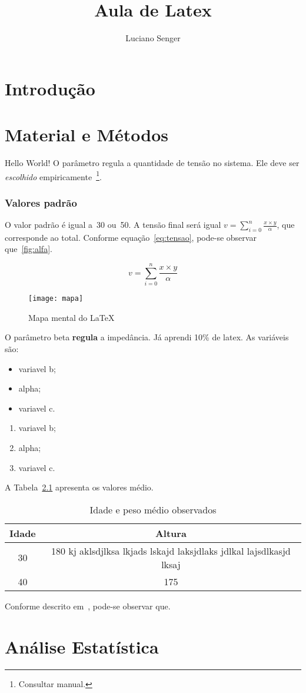 \documentclass[a4paper, brazil, 12pt , onecolumn]{report}
\title{Aula de Latex}
\author{Luciano Senger}
\begin{document}
	\maketitle
	\tableofcontents
	\listoffigures
	\listoftables
\chapter{Introdução}
\lipsum[1-3]
\chapter{Material e Métodos}

Hello    World!
O parâmetro   regula a quantidade de tensão no sistema.
Ele deve ser \textit{escolhido} empiricamente~\footnote{Consultar manual.}.
\subsection{Valores padrão}
O valor padrão é igual a~30 ou~50.
A tensão final será igual $v = \sum_{i=0}^n \frac{x \times y}{\alpha}$, que corresponde ao total.
Conforme equação~\ref{eq:tensao}, pode-se observar que~\ref{fig:alfa}.

\begin{equation}
	v = \sum_{i=0}^n \frac{x \times y}{\alpha}
\end{equation}\label{eq:tensao}

\begin{figure}[htb]
	\centering
	\texttt{[image: mapa]}
	\caption{Mapa mental do \LaTeX}
\end{figure}\label{fig:alfa}

O parâmetro {\Huge beta} \textbf{regula} a impedância.
Já aprendi 10\% de latex.
As variáveis são:
\begin{itemize}
	\item variavel b;
	\item alpha;
	\item variavel c.
\end{itemize}

\begin{enumerate}
	\item variavel b;
	\item alpha;
	\item variavel c.
\end{enumerate}
A Tabela~\ref{tab:idade} apresenta os valores médio.
\begin{table}[htb]
	\caption{Idade e peso médio observados}\label{tab:idade}
	\centering
	
	\begin{tabular}{cc}
		\hline
		\bf Idade & \bf Altura \\ 
		\hline
		30 & 180 kj aklsdjlksa lkjads lskajd laksjdlaks jdlkal lajsdlkasjd lksaj\\
		40 & 175 \\
		\hline
\end{tabular}		
\end{table}
\lstset{language=Python}


Conforme descrito em~\cite{Harris2012,Hennessy2014,Goodfellow2016,Mota2011}, pode-se observar que.
\appendix
\chapter{Análise Estatística}
\lipsum[3-8]
\printindex


\end{document}
